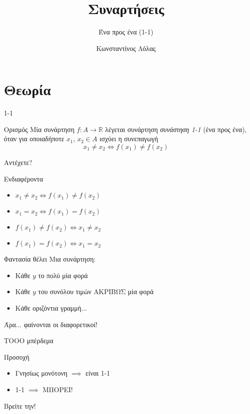 \documentclass{presentation}
\title{Συναρτήσεις}
\subtitle{Ένα προς ένα (1-1)}
\author[Λόλας]{Κωνσταντίνος Λόλας }
\institute[$10^ο$ ΓΕΛ]{$10^ο$ ΓΕΛ Θεσσαλονίκης}
\date{}
\begin{document}
\begin{frame}
  \titlepage
\end{frame}

\section{Θεωρία}
\begin{frame}{1-1}
  \begin{block}{Ορισμός}
    Μία συνάρτηση $f:Α\to\mathbb{R}$ λέγεται συνάρτηση \emph{συνάστηση 1-1} (ένα προς ένα), όταν για οποιαδήποτε $x_1$, $x_2\in Α$ ισχύει η συνεπαγωγή
    $$x_1\ne x_2 \iff f(x_1)\ne f(x_2)$$
  \end{block}
\end{frame}

\begin{frame}{Αντέχετε?}
  \begin{exampleblock}{Ενδιαφέροντα}
    \begin{itemize}
      \item $x_1\ne x_2 \iff f(x_1)\ne f(x_2)$
      \item $x_1= x_2 \iff f(x_1)= f(x_2)$
      \item $f(x_1)\ne f(x_2) \iff x_1\ne x_2$
      \item $f(x_1)= f(x_2) \iff x_1= x_2$
    \end{itemize}
  \end{exampleblock}
\end{frame}

\begin{frame}{Φαντασία θέλει}
  Μια συνάρτηση:
  \begin{itemize}
    \item Κάθε $y$ το πολύ μία φορά \pause
    \item Κάθε $y$ του συνόλου τιμών ΑΚΡΙΒΩΣ μία φορά \pause
    \item Κάθε οριζόντια γραμμή...
  \end{itemize}
  Άρα... φαίνονται οι διαφορετικοί!
\end{frame}

\begin{frame}{ΤΟΟΟ μπέρδεμα}
  \begin{alertblock}{Προσοχή}
    \begin{itemize}
      \item Γνησίως μονότονη $\implies$ \pause είναι 1-1 \pause
      \item  1-1 $\implies$ \pause ΜΠΟΡΕΙ!
    \end{itemize}
  \end{alertblock}
  Βρείτε την!
\end{frame}
\end{document}
